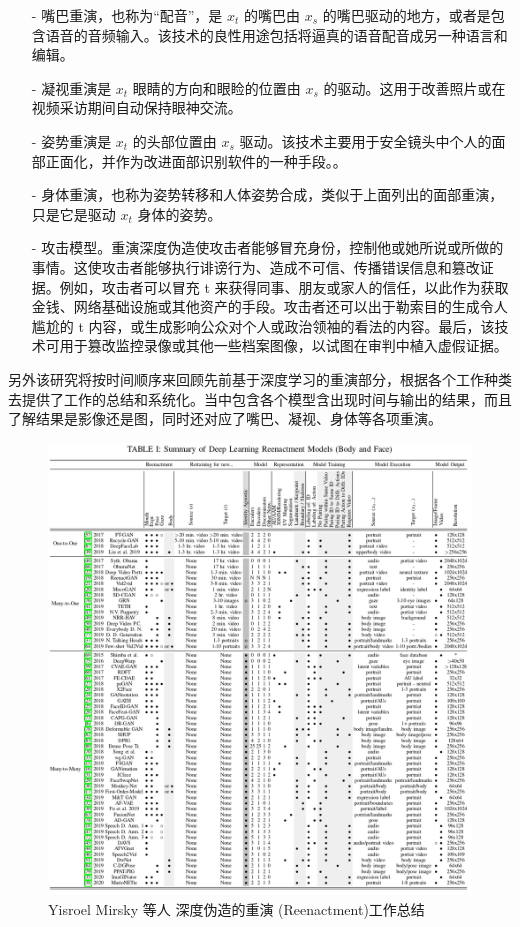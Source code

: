 \begin{itemize}
\item [-] 嘴巴重演，也称为“配音”，是 $x_t$ 的嘴巴由 $x_s$ 的嘴巴驱动的地方，或者是包含语音的音频输入。该技术的良性用途包括将逼真的语音配音成另一种语言和编辑。
\item [-] 凝视重演是 $x_t$ 眼睛的方向和眼睑的位置由 $x_s$ 的驱动。这用于改善照片或在视频采访期间自动保持眼神交流。
\item [-] 姿势重演是 $x_t$ 的头部位置由 $x_s$ 驱动。该技术主要用于安全镜头中个人的面部正面化，并作为改进面部识别软件的一种手段。。
\item [-] 身体重演，也称为姿势转移和人体姿势合成，类似于上面列出的面部重演，只是它是驱动 $x_t$ 身体的姿势。
\item [-] 攻击模型。重演深度伪造使攻击者能够冒充身份，控制他或她所说或所做的事情。这使攻击者能够执行诽谤行为、造成不可信、传播错误信息和篡改证据。例如，攻击者可以冒充 t 来获得同事、朋友或家人的信任，以此作为获取金钱、网络基础设施或其他资产的手段。攻击者还可以出于勒索目的生成令人尴尬的 t 内容，或生成影响公众对个人或政治领袖的看法的内容。最后，该技术可用于篡改监控录像或其他一些档案图像，以试图在审判中植入虚假证据。
\end{itemize}

另外该研究将按时间顺序来回顾先前基于深度学习的重演部分，根据各个工作种类去提供了工作的总结和系统化。当中包含各个模型含出现时间与输出的结果，而且了解结果是影像还是图，同时还对应了嘴巴、凝视、身体等各项重演。

\begin{figure}[htb]
\centering 
\includegraphics[width=1.10\textwidth]{img/ch4m5.png} 
\caption{ Yisroel Mirsky 等人 \cite{DBLP:journals/corr/abs-2004-11138} 深度伪造的重演 (Reenactment)工作总结}
\label{Test}
\end{figure}

